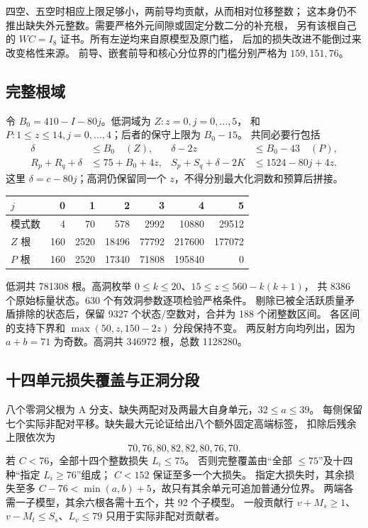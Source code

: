 \documentclass[11pt,a4paper]{article}
\theoremstyle{definition}
\begin{document}
四空、五空时相应上限足够小，两前导均贡献，从而相对位移整数；
这本身仍不推出缺失外元整数。需要严格外元间隙或固定分数二分的补充根，
另有该根自己的 $WC=I_8$ 证书。所有左逆均来自原模型及原门槛，
后加的损失改进不能倒过来改变格性来源。
前导、嵌套前导和核心分位界的门槛分别严格为 $159,151,76$。

\subsection{完整根域}
令 $B_0=410-I-80j$。低洞域为 $Z:z=0,j=0,\ldots,5$，
和 $P:1\le z\le14,j=0,\ldots,4$；后者的保守上限为 $B_0-15$。
共同必要行包括
\begin{align*}
 \delta&\le B_0\quad(Z),&\delta-2z&\le B_0-43\quad(P),\\
 R_p+R_q+\delta&\le75+B_0+4z,&
 S_p+S_q+\delta-2K&\le1524-80j+4z.
\end{align*}
这里 $\delta=c-80j$；高洞仍保留同一个 $z$，不得分别最大化洞数和预算后拼接。
\begin{center}\small\begin{tabular}{lrrrrrr}\toprule
$j$&0&1&2&3&4&5\\\midrule
模式数&4&70&578&2992&10880&29512\\
$Z$ 根&160&2520&18496&77792&217600&177072\\
$P$ 根&160&2520&17340&71808&195840&0\\\bottomrule
\end{tabular}\end{center}
低洞共 781308 根。高洞枚举 $0\le k\le20$、$15\le z\le560-k(k+1)$，
共 8386 个原始标量状态。630 个有效洞参数逐项检验严格条件。
剔除已被全活跃质量矛盾排除的状态后，保留 9327 个状态/空数对，合并为 188 个闭整数区间。
各区间的支持下界和 $\max(50,z,150-2z)$ 分段保持不变。
两反射方向均列出，因为 $a+b=71$ 为奇数。高洞共 346972 根，总数 1128280。

\subsection{十四单元损失覆盖与正洞分段}
八个零洞父根为 A 分支、缺失两配对及两最大自身单元，$32\le a\le39$。
每侧保留七个实际非配对平移。缺失最大元论证给出八个额外固定高端标签，
扣除后残余上限依次为
\[
 70,76,80,82,82,80,76,70.
\]
若 $C<76$，全部十四个整数损失 $L_i\le75$。
否则完整覆盖由“全部 $\le75$”及十四种“指定 $L_i\ge76$”组成；
$C<152$ 保证至多一个大损失。
指定大损失时，其余损失至多 $C-76<\min(a,b)+5$，故只有其余单元可追加普通分位界。
两端各需一子模型，其余六根各需十五个，共 92 个子模型。
一般贡献行 $v+M_s\ge1$、$v-M_t\le S_s$、$L_v\le79$ 只用于实际非配对贡献者。
\end{document}
